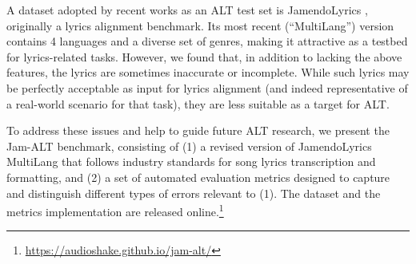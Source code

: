 \documentclass{article}
\begin{document}
A dataset adopted by recent works \cite{gupta2020,demirel2021mstrenet,demirel2021low,ou-2022-wav2vec2-alt,zhuo-2023-lyricwhiz} as an ALT test set is JamendoLyrics \cite{stoller2019end}, originally a lyrics alignment benchmark.
Its most recent (``MultiLang'') version \cite{durand-2023-contrastive} contains 4 languages and a diverse set of genres, making it attractive as a testbed for lyrics-related tasks.
However, we found that, in addition to lacking the above features, the lyrics are sometimes inaccurate or incomplete.
While such lyrics may be perfectly acceptable as input for lyrics alignment (and indeed representative of a real-world scenario for that task), they are less suitable as a target for ALT.

To address these issues and help to guide future ALT research, we present the Jam-ALT benchmark, consisting of (1) a revised version of JamendoLyrics MultiLang that follows industry standards for song lyrics transcription and formatting, and (2) a set of automated evaluation metrics designed to capture and distinguish different types of errors relevant to (1).
The dataset and the metrics implementation are released online.\footnote{\url{https://audioshake.github.io/jam-alt/}}
\end{document}
